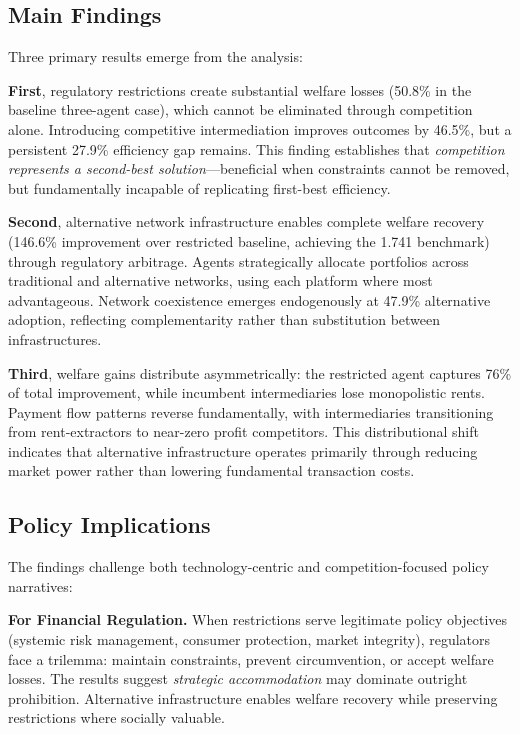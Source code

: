 \documentclass[12pt]{article}
\begin{document}
\subsection{Main Findings}

Three primary results emerge from the analysis:

\textbf{First}, regulatory restrictions create substantial welfare losses (50.8\% in the baseline three-agent case), which cannot be eliminated through competition alone. Introducing competitive intermediation improves outcomes by 46.5\%, but a persistent 27.9\% efficiency gap remains. This finding establishes that \textit{competition represents a second-best solution}---beneficial when constraints cannot be removed, but fundamentally incapable of replicating first-best efficiency.

\textbf{Second}, alternative network infrastructure enables complete welfare recovery (146.6\% improvement over restricted baseline, achieving the 1.741 benchmark) through regulatory arbitrage. Agents strategically allocate portfolios across traditional and alternative networks, using each platform where most advantageous. Network coexistence emerges endogenously at 47.9\% alternative adoption, reflecting complementarity rather than substitution between infrastructures.

\textbf{Third}, welfare gains distribute asymmetrically: the restricted agent captures 76\% of total improvement, while incumbent intermediaries lose monopolistic rents. Payment flow patterns reverse fundamentally, with intermediaries transitioning from rent-extractors to near-zero profit competitors. This distributional shift indicates that alternative infrastructure operates primarily through reducing market power rather than lowering fundamental transaction costs.

\subsection{Policy Implications}

The findings challenge both technology-centric and competition-focused policy narratives:

\textbf{For Financial Regulation.} When restrictions serve legitimate policy objectives (systemic risk management, consumer protection, market integrity), regulators face a trilemma: maintain constraints, prevent circumvention, or accept welfare losses. The results suggest \textit{strategic accommodation} may dominate outright prohibition. Alternative infrastructure enables welfare recovery while preserving restrictions where socially valuable.
\end{document}

